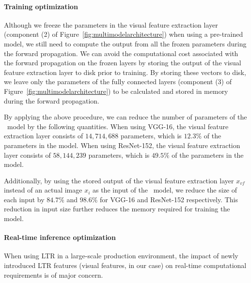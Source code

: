 \paragraph{Training optimization} 
Although we freeze the parameters in the visual feature extraction layer (component (2) of Figure~\ref{fig:multimodelarchitecture}) when using a pre-trained model, we still need to compute the output from all the frozen parameters during the forward propagation.
We can avoid the computational cost associated with the forward propagation on the frozen layers by storing the output of the visual feature extraction layer to disk prior to training.
By storing these vectors to disk, we leave only the parameters of the fully connected layers (component (3) of Figure~\ref{fig:multimodelarchitecture}) to be calculated and stored in memory during the forward propagation. 

By applying the above procedure, we can reduce the number of parameters of the \modelname~model by the following quantities.
When using VGG-16, the visual feature extraction layer consists of $14,714,688$ parameters, which is $12.3\%$ of the parameters in the \modelname{} model.
When using ResNet-152, the visual feature extraction layer consists of $58,144,239$ parameters, which is $49.5\%$ of the parameters in the \modelname{} model.

Additionally, by using the stored output of the visual feature extraction layer $x_{vf}$ instead of an actual image $x_{i}$ as the input of the \modelname~model,
we reduce the size of each input by $84.7\%$ and $98.6\%$ for VGG-16 and ResNet-152 respectively.
This reduction in input size further reduces the memory required for training the model.


\paragraph{Real-time inference optimization}
When using \ac{LTR} in a large-scale production environment, the impact of newly introduced \ac{LTR} features (visual features, in our case) on real-time computational requirements is of major concern.

